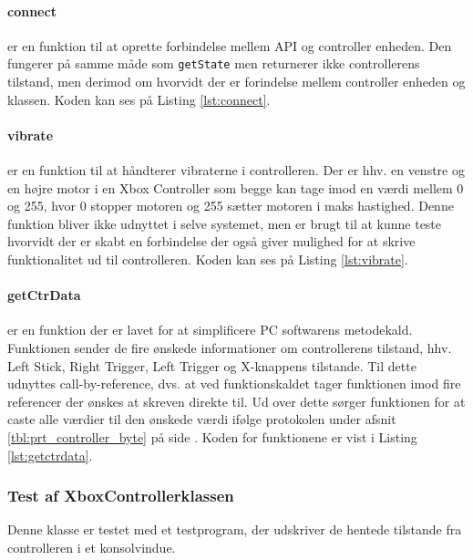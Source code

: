 \clearpage

\paragraph{connect} er en funktion til at oprette forbindelse mellem API og controller enheden. Den fungerer på samme måde som \texttt{getState} men returnerer ikke controllerens tilstand, men derimod om hvorvidt der er forindelse mellem controller enheden og klassen. Koden kan ses på Listing \ref{lst:connect}.




\paragraph{vibrate} er en funktion til at håndterer vibraterne i controlleren. Der er hhv. en venstre og en højre motor i en Xbox Controller som begge kan tage imod en værdi mellem 0 og 255, hvor 0 stopper motoren og 255 sætter motoren i maks hastighed. Denne funktion bliver ikke udnyttet i selve systemet, men er brugt til at kunne teste hvorvidt der er skabt en forbindelse der også giver mulighed for at skrive funktionalitet ud til controlleren.  Koden kan ses på Listing \ref{lst:vibrate}.



\clearpage

\paragraph{getCtrData} er en funktion der er lavet for at simplificere PC softwarens metodekald. Funktionen sender de fire ønskede informationer om controllerens tilstand, hhv. Left Stick, Right Trigger, Left Trigger og X-knappens tilstande. Til dette udnyttes call-by-reference, dvs. at ved funktionskaldet tager funktionen imod fire referencer der ønskes at skreven direkte til. Ud over dette sørger funktionen for at caste alle værdier til den ønskede værdi ifølge protokolen under afsnit \ref{tbl:prt_controller_byte}  på side \pageref{tbl:prt_controller_byte}. Koden for funktionene er vist i Listing \ref{lst:getctrdata}.



\subsubsection{Test af XboxControllerklassen}
Denne klasse er testet med et testprogram, der udskriver de hentede tilstande fra controlleren i et konsolvindue.

\clearpage